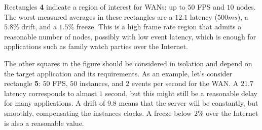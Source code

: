 \documentclass[sigplan,screen]{acmart}
\begin{document}
Rectangles \textbf{4} indicate a region of interest for WANs: up to $50$ FPS
and $10$ nodes.
The worst measured averages in these rectangles are
    a $12.1$ latency ($500ms$),
    a $5.8\%$ drift, and
    a $1.5\%$ freeze.
This is a high frame rate region that admits a reasonable number of nodes,
possibly with low event latency, which is enough for applications such as
family watch parties over the Internet.

The other squares in the figure should be considered in isolation and depend on
the target application and its requirements.
%
As an example, let's consider rectangle \textbf{5}: $50$ FPS, $50$ instances,
and $2$ events per second for the WAN.
A $21.7$ latency corresponds to almost $1$ second, but this might still be a
reasonable delay for many applications.
A drift of $9.8$ means that the server will be constantly, but smoothly,
compensating the instances clocks.
A freeze below $2\%$ over the Internet is also a reasonable value.

\end{document}
